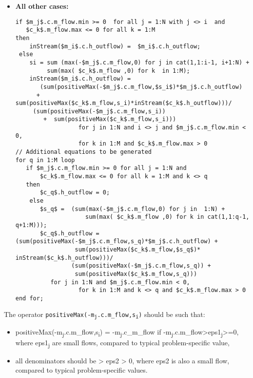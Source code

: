 \begin{nonnormative}
\begin{itemize}
\item\textbf{All other cases:}\newline
\begin{lstlisting}[language=modelica,mathescape=true]
if $m_j$.c.m_flow.min >= 0  for all j = 1:N with j <> i  and
   $c_k$.m_flow.max <= 0 for all k = 1:M
then
    inStream($m_i$.c.h_outflow) =  $m_i$.c.h_outflow;
 else
    si = sum (max(-$m_j$.c.m_flow,0) for j in cat(1,1:i-1, i+1:N) +
         sum(max( $c_k$.m_flow ,0) for k  in 1:M);
    inStream($m_i$.c.h_outflow) =
       (sum(positiveMax(-$m_j$.c.m_flow,$s_i$)*$m_j$.c.h_outflow)
      +  sum(positiveMax($c_k$.m_flow,s_i)*inStream($c_k$.h_outflow)))/
     (sum(positiveMax(-$m_j$.c.m_flow,s_i))
        +  sum(positiveMax($c_k$.m_flow,s_i)))
                  for j in 1:N and i <> j and $m_j$.c.m_flow.min < 0,
                  for k in 1:M and $c_k$.m_flow.max > 0
// Additional equations to be generated
for q in 1:M loop
   if $m_j$.c.m_flow.min >= 0 for all j = 1:N and
       $c_k$.m_flow.max <= 0 for all k = 1:M and k <> q
   then
       $c_q$.h_outflow = 0;
    else
       $s_q$ =  (sum(max(-$m_j$.c.m_flow,0) for j in  1:N) +
                    sum(max( $c_k$.m_flow ,0) for k in cat(1,1:q-1, q+1:M)));
       $c_q$.h_outflow = (sum(positiveMax(-$m_j$.c.m_flow,s_q)*$m_j$.c.h_outflow) +
                 sum(positiveMax($c_k$.m_flow,$s_q$)* inStream($c_k$.h_outflow)))/
                (sum(positiveMax(-$m_j$.c.m_flow,s_q)) +
                 sum(positiveMax($c_k$.m_flow,s_q)))
		  for j in 1:N and $m_j$.c.m_flow.min < 0,
                  for k in 1:M and k <> q and $c_k$.m_flow.max > 0
end for;
\end{lstlisting}
\end{itemize}

The operator
\texttt{positiveMax(-m\textsubscript{j}.c.m\_flow,s\textsubscript{i})}
should be such that:
\begin{itemize}
\item
  positiveMax(-m\textsubscript{j}.c.m\_flow,s\textsubscript{i}) =
  -m\textsubscript{j}.c\_m\_flow if
  -m\textsubscript{j}.c.m\_flow\textgreater{}eps1\textsubscript{j}\textgreater{}=0,
  where eps1\textsubscript{j} are small flows, compared to typical
  problem-specific value,
\item
  all denominators should be \textgreater{} eps2 \textgreater{} 0,
  where eps2 is also a small flow, compared to typical problem-specific
  values.
\end{itemize}


\end{nonnormative}
